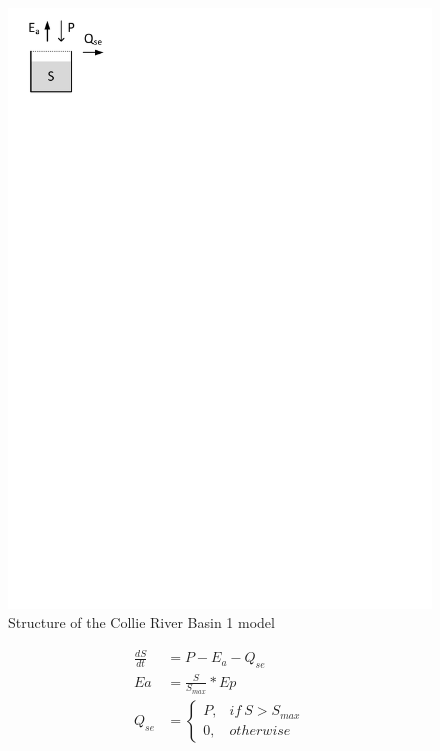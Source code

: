 { 																	%
\begin{figure}
\includegraphics[trim=1cm 25.5cm 9cm 1cm,keepaspectratio]{./AppA_files/01_schematic.pdf}
\caption{Structure of the Collie River Basin 1 model} \label{fig:01_schematic}
\end{figure}

\begin{align}
	\frac{dS}{dt} &= P -E_a-Q_{se} \\
	Ea &= \frac{S}{S_{max}}*Ep\\
	Q_{se} &= 
		\begin{cases}
			P, & if~S>S_{max}\\
			0, & otherwise
		\end{cases}
\end{align}
}
\vspace{1.5cm}

